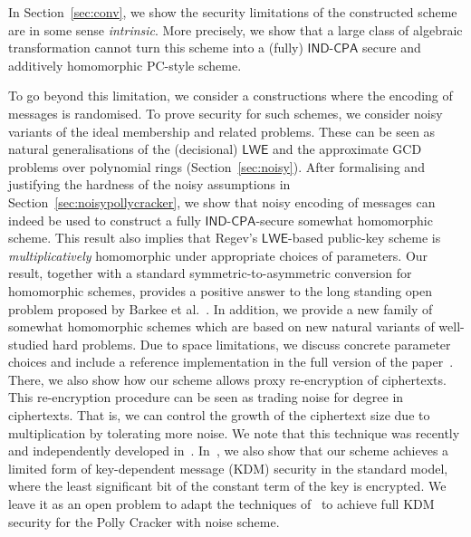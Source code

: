 \documentclass[draft]{llncs}
\newcommand{\LWE}{\ensuremath{\mathsf{LWE}}\xspace}
\newcommand{\IND}{\mathsf{IND}}
\newcommand{\CPA}{\mathsf{CPA}}
\newcommand{\INDCPA}{\ensuremath{\IND\mbox{-}\CPA}\xspace}
\begin{document}
In Section~\ref{sec:conv}, we show the security limitations of the constructed scheme are in some sense {\em intrinsic}. More precisely, we show that a large class of algebraic transformation cannot turn this scheme into a (fully) $\INDCPA$ secure and additively homomorphic PC-style scheme.

To go beyond this limitation, we consider a constructions where the encoding of messages is randomised. To prove security for such schemes, we consider noisy variants of the ideal membership and related problems. These can be seen as natural generalisations of the (decisional) \LWE and the approximate GCD problems over polynomial rings (Section~\ref{sec:noisy}). After formalising and justifying the hardness of the noisy assumptions in Section~\ref{sec:noisypollycracker}, we show that noisy encoding of messages can indeed be used to construct a fully $\INDCPA$-secure somewhat homomorphic scheme. This result also implies that Regev's \LWE-based public-key scheme is {\em multiplicatively} homomorphic under appropriate choices of parameters. Our result, together with a standard symmetric-to-asymmetric conversion for homomorphic schemes, provides a positive answer to the long standing open problem proposed by Barkee et al.~\cite{DBLP:journals/jsc/BarkeeCEMR94}. In addition, we provide a new family of somewhat homomorphic schemes which are based on new natural variants of well-studied hard problems. Due to space limitations, we discuss concrete parameter choices and include a reference implementation in the full version of the paper~\cite{full}. There, we also show how our scheme allows proxy re-encryption of ciphertexts. This re-encryption procedure can be seen as trading noise for degree in ciphertexts. That is, we can control the growth of the ciphertext size due to multiplication by tolerating more noise. We note that this technique was recently and independently developed in~\cite{LWEhom}. In~\cite{full}, we also show that our scheme achieves a limited form of key-dependent message (KDM) security in the standard model, where the least significant bit of the constant term of the key is encrypted. We leave it as an open problem to adapt the techniques of~\cite{ACPS09} to achieve full KDM security for the Polly Cracker with noise scheme. 
\end{document}
